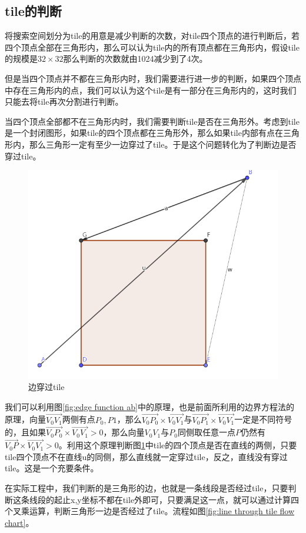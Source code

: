 \subsection{tile的判断}
\label{subsubsection:tile check}
将搜索空间划分为tile的用意是减少判断的次数，对tile四个顶点的进行判断后，若四个顶点全部在三角形内，那么可以认为tile内的所有顶点都在三角形内，假设tile的规模是$32\times 32$那么判断的次数就由1024减少到了4次。

但是当四个顶点并不都在三角形内时，我们需要进行进一步的判断，如果四个顶点中存在三角形内的点，我们可以认为这个tile是有一部分在三角形内的，这时我们只能去将tile再次分割进行判断。

当四个顶点全部都不在三角形内时，我们需要判断tile是否在三角形外。考虑到tile是一个封闭图形，如果tile的四个顶点都在三角形外，那么如果tile内部有点在三角形内，那么三角形一定有至少一边穿过了tile。于是这个问题转化为了判断边是否穿过tile。

\begin{figure}[h]
    \centering
    \includegraphics[width=.5\textwidth]{figure/linethroughtile.png}
    \caption{\label{fig:line tile}边穿过tile}
\end{figure}

我们可以利用图\ref{fig:edge function ab}中的原理，也是前面所利用的边界方程法的原理，向量$\overrightarrow{V_0V_1}$两侧有点$P_0,P1$，那么$\overrightarrow{V_0P_0}\times\overrightarrow{V_0V_1}$与$\overrightarrow{V_0P_1}\times\overrightarrow{V_0V_1}$一定是不同符号的，且如果$\overrightarrow{V_0P_0}\times\overrightarrow{V_0V_1}>0$，那么向量$V_0V_1$与$P_0$同侧取任意一点$P$仍然有$\overrightarrow{V_0P}\times\overrightarrow{V_0V_1}>0$。利用这个原理判断图\ref{fig:line tile}中tile的四个顶点是否在直线的两侧，只要tile四个顶点不在直线u的同侧，那么直线就一定穿过tile，反之，直线没有穿过tile。这是一个充要条件。

在实际工程中，我们判断的是三角形的边，也就是一条线段是否经过tile，只要判断这条线段的起止x,y坐标不都在tile外即可，只要满足这一点，就可以通过计算四个叉乘运算，判断三角形一边是否经过了tile。流程如图\ref{fig:line through tile flow chart}。

